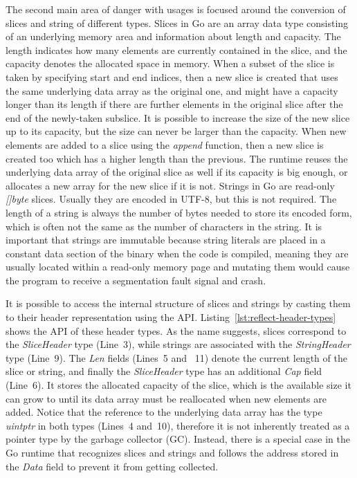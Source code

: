 The second main area of danger with \unsafe{} usages is focused around the conversion of slices and string of different
types.
Slices in Go are an array data type consisting of an underlying memory area and information about length and capacity.
The length indicates how many elements are currently contained in the slice, and the capacity denotes the allocated
space in memory.
When a subset of the slice is taken by specifying start and end indices, then a new slice is created that uses the same
underlying data array as the original one, and might have a capacity longer than its length if there are further
elements in the original slice after the end of the newly-taken subslice.
It is possible to increase the size of the new slice up to its capacity, but the size can never be larger than the
capacity.
When new elements are added to a slice using the \textit{append} function, then a new slice is created too which has a
higher length than the previous.
The runtime reuses the underlying data array of the original slice as well if its capacity is big enough, or allocates
a new array for the new slice if it is not.
Strings in Go are read-only \textit{[]byte} slices.
Usually they are encoded in UTF-8, but this is not required.
The length of a string is always the number of bytes needed to store its encoded form, which is often not the same as
the number of characters in the string.
It is important that strings are immutable because string literals are placed in a constant data section of the binary
when the code is compiled, meaning they are usually located within a read-only memory page and mutating them would cause
the program to receive a segmentation fault signal and crash.



It is possible to access the internal structure of slices and strings by casting them to their header representation
using the \unsafe{} \acrshort{API}.
Listing~\ref{lst:reflect-header-types} shows the \acrshort{API} of these header types.
As the name suggests, slices correspond to the \textit{SliceHeader} type (Line~3), while strings are associated with the
\textit{StringHeader} type (Line~9).
The \textit{Len} fields (Lines~5 and ~11) denote the current length of the slice or string, and finally the
\textit{SliceHeader} type has an additional \textit{Cap} field (Line~6).
It stores the allocated capacity of the slice, which is the available size it can grow to until its data array must be
reallocated when new elements are added.
Notice that the reference to the underlying data array has the type \textit{uintptr} in both types (Lines~4 and~10),
therefore it is not inherently treated as a pointer type by the garbage collector (\acrshort{GC}).
Instead, there is a special case in the Go runtime that recognizes slices and strings and follows the address stored in
the \textit{Data} field to prevent it from getting collected.


